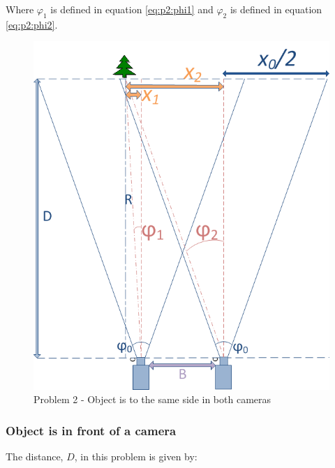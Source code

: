 Where $\varphi_1$ is defined in equation \eqref{eq:p2:phi1} and $\varphi_2$ is defined in equation \eqref{eq:p2:phi2}. 

\begin{figure}
\includegraphics[width=\textwidth,height=\textheight,keepaspectratio]{Figures/problem2.png}
\caption{Problem 2 - Object is to the same side in both cameras}
\label{problem_toleft}
\end{figure}

\subsubsection{Object is in front of a camera}
The distance, $D$, in this problem is given by:

